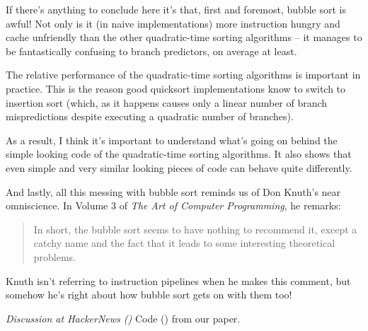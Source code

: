 \documentclass[11pt]{article}
\begin{document}
If there's anything to conclude here it's that, first and foremost, bubble sort is awful! Not only is it (in naive implementations) more instruction hungry and cache unfriendly than the other quadratic-time sorting algorithms -- it manages to be fantastically confusing to branch predictors, on average at least.

The relative performance of the quadratic-time sorting algorithms is important in practice. This is the reason good quicksort implementations know to switch to insertion sort (which, as it happens causes only a linear number of branch mispredictions despite executing a quadratic number of branches).

As a result, I think it's important to understand what's going on behind the simple looking code of the quadratic-time sorting algorithms. It also shows that even simple and very similar looking pieces of code can behave quite differently.

And lastly, all this messing with bubble sort reminds us of Don Knuth's near omniscience. In Volume 3 of \emph{The Art of Computer Programming}, he remarks:

\begin{quote}
In short, the bubble sort seems to have nothing to recommend it, except
a catchy name and the fact that it leads to some interesting theoretical
problems.
\end{quote}

Knuth isn't referring to instruction pipelines when he makes this comment, but somehow he's right about how bubble sort gets on with them too!

\emph{Discussion at HackerNews (\texttt{})}
Code (\texttt{}) from our paper.
\end{document}
